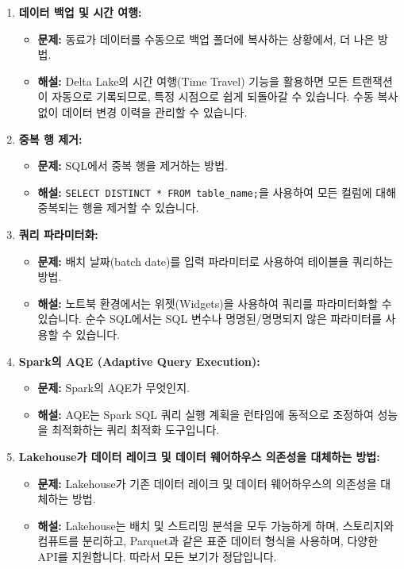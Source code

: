 \documentclass[11pt,a4paper]{article}
\theoremstyle{definition}
\begin{document}
\begin{enumerate}
    \item \textbf{데이터 백업 및 시간 여행:}
    \begin{itemize}
        \item \textbf{문제:} 동료가 데이터를 수동으로 백업 폴더에 복사하는 상황에서, 더 나은 방법.
        \item \textbf{해설:} Delta Lake의 시간 여행(Time Travel) 기능을 활용하면 모든 트랜잭션이 자동으로 기록되므로, 특정 시점으로 쉽게 되돌아갈 수 있습니다. 수동 복사 없이 데이터 변경 이력을 관리할 수 있습니다.
    \end{itemize}

    \item \textbf{중복 행 제거:}
    \begin{itemize}
        \item \textbf{문제:} SQL에서 중복 행을 제거하는 방법.
        \item \textbf{해설:} \texttt{SELECT DISTINCT * FROM table_name;}을 사용하여 모든 컬럼에 대해 중복되는 행을 제거할 수 있습니다.
    \end{itemize}

    \item \textbf{쿼리 파라미터화:}
    \begin{itemize}
        \item \textbf{문제:} 배치 날짜(batch date)를 입력 파라미터로 사용하여 테이블을 쿼리하는 방법.
        \item \textbf{해설:} 노트북 환경에서는 위젯(Widgets)을 사용하여 쿼리를 파라미터화할 수 있습니다. 순수 SQL에서는 SQL 변수나 명명된/명명되지 않은 파라미터를 사용할 수 있습니다.
    \end{itemize}

    \item \textbf{Spark의 AQE (Adaptive Query Execution):}
    \begin{itemize}
        \item \textbf{문제:} Spark의 AQE가 무엇인지.
        \item \textbf{해설:} AQE는 Spark SQL 쿼리 실행 계획을 런타임에 동적으로 조정하여 성능을 최적화하는 쿼리 최적화 도구입니다.
    \end{itemize}

    \item \textbf{Lakehouse가 데이터 레이크 및 데이터 웨어하우스 의존성을 대체하는 방법:}
    \begin{itemize}
        \item \textbf{문제:} Lakehouse가 기존 데이터 레이크 및 데이터 웨어하우스의 의존성을 대체하는 방법.
        \item \textbf{해설:} Lakehouse는 배치 및 스트리밍 분석을 모두 가능하게 하며, 스토리지와 컴퓨트를 분리하고, Parquet과 같은 표준 데이터 형식을 사용하며, 다양한 API를 지원합니다. 따라서 모든 보기가 정답입니다.
    \end{itemize}


\end{enumerate}
\end{document}
